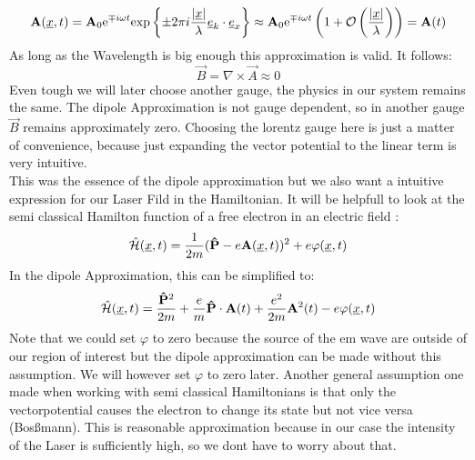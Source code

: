 \begin{equation*}
    \mathbf{A}(\underline{x}, t) = \mathbf{A}_0\mathrm{e}^{\mp i \omega t}\mathrm{exp}\left\{\pm2\pi i\frac{|\underline{x}|}{\lambda}\underline{e}_k \cdot \underline{e}_x\right\} \approx \mathbf{A}_0 \mathrm{e}^{\mp i \omega t}\left(1+\mathcal{O}\left(\frac{|\underline{x}|}{\lambda}\right)\right) = \mathbf{A}(t)
\end{equation*}
As long as the Wavelength is big enough this approximation is valid. It follows:
\begin{equation*}
    \vec{B} = \nabla \times \vec{A} \approx 0
\end{equation*}
Even tough we will later choose another gauge, the physics in our system remains the same. The dipole Approximation is not gauge dependent, so in another gauge $\vec{B}$ remains approximately zero.
Choosing the lorentz gauge here is just a matter of convenience, because just expanding the vector potential to the linear term is very intuitive. \\
This was the essence of the dipole approximation but we also want a intuitive expression for our Laser Fild in the Hamiltonian.
It will be helpfull to look at the semi classical Hamilton function of a free electron in an electric field \cite{LandauLifschitzBand2}: %
\begin{equation} %
    \hat{\Hs}(\uvec{x}, t) = \frac{1}{2m}(\vec{\hat{P}} - e \vec{A}(\uvec{x}, t))^2 + e \varphi(\uvec{x}, t)  \label{eq:semiClassicalHamilton}    %
\end{equation}
In the dipole Approximation, this can be simplified to:
\begin{equation*}
    \hat{\Hs}(\uvec{x}, t) = \frac{\vec{\hat{P}}^2}{2m} + \frac{e}{m}\vec{\hat{P}}\cdot \vec{A}(t) + \frac{e^2}{2m}\vec{A}^2(t) - e \varphi(\uvec{x}, t) %
\end{equation*}
Note that we could set $\varphi$ to zero because the source of the em wave are outside of our region of interest but the dipole approximation can be made without this assumption. 
We will however set $\varphi$ to zero later. 
Another general assumption one made when working with semi classical Hamiltonians is that only the vectorpotential causes the electron to change its state but not vice versa (Bosßmann). 
This is reasonable approximation because in our case the intensity of the Laser is sufficiently high, so we dont have to worry about that.
